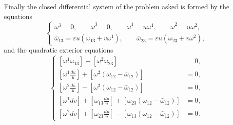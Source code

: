 \documentclass[leqno,11pt]{book}
\numberwithin{equation}{chapter}
\theoremstyle{shape1}
\theoremstyle{shape0}
\theoremstyle{shape2}
\theoremstyle{definition}
\begin{document}
Finally the closed differential system of the problem asked is formed by the equations
\begin{equation}
  \label{eq:7.X.1}\tag{X, 1}
  \left\{
    \begin{gathered}
      \omega^{3}=0,\qquad\bar\omega^{3}=0,\qquad\bar\omega^{1}=u\omega^{1},\qquad\bar\omega^{2}=u\omega^{2},\\
      \bar\omega_{13}=\varepsilon u(\omega_{13}+v\omega^{1}),\qquad\bar\omega_{23}=\varepsilon u(\omega_{23}+v\omega^{2}),
    \end{gathered}
  \right.
\end{equation}
and the quadratic exterior equations
\begin{equation}
  \label{eq:7.X.2}\tag{X, 2}
  \left\{
    \begin{aligned}{}
      [\omega^{1}\omega_{13}]+[\omega^{2}\omega_{23}]&=0,\\
      \left[\omega^{1}\frac{du}{u}\right]+[\omega^{2}(\omega_{12}-\bar\omega_{12})]&=0,\\
      \left[\omega^{2}\frac{du}{u}\right]-[\omega^{2}(\omega_{12}-\bar\omega_{12})]&=0,\\
      [\omega^{1}dv]+\left[\omega_{13}\frac{du}{u}\right]+[\omega_{23}(\omega_{12}-\bar\omega_{12})]&=0,\\
      [\omega^{2}dv]+\left[\omega_{23}\frac{du}{u}\right]-[\omega_{13}(\omega_{12}-\bar\omega_{12})]&=0.
    \end{aligned}
  \right.
\end{equation}
\end{document}
